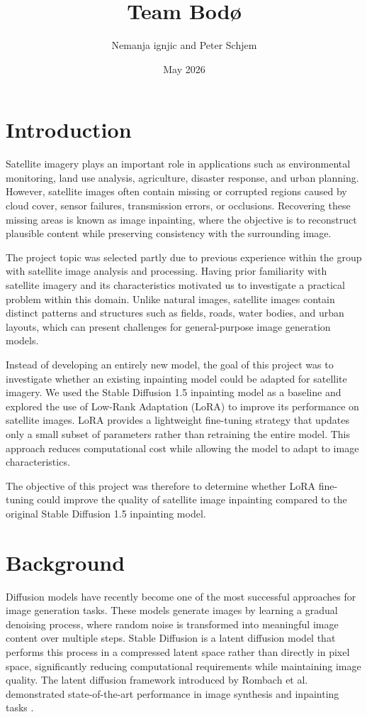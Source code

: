 \documentclass{article}
\title{Team Bodø}
\author{Nemanja ignjic and Peter Schjem}
\date{May 2026}
\begin{document}
\maketitle

\section{Introduction}
Satellite imagery plays an important role in applications such as environmental monitoring, land use analysis, agriculture, disaster response, and urban planning. However, satellite images often contain missing or corrupted regions caused by cloud cover, sensor failures, transmission errors, or occlusions. Recovering these missing areas is known as image inpainting, where the objective is to reconstruct plausible content while preserving consistency with the surrounding image.

The project topic was selected partly due to previous experience within the group with satellite image analysis and processing. Having prior familiarity with satellite imagery and its characteristics motivated us to investigate a practical problem within this domain. Unlike natural images, satellite images contain distinct patterns and structures such as fields, roads, water bodies, and urban layouts, which can present challenges for general-purpose image generation models.

Instead of developing an entirely new model, the goal of this project was to investigate whether an existing inpainting model could be adapted for satellite imagery. We used the Stable Diffusion 1.5 inpainting model as a baseline and explored the use of Low-Rank Adaptation (LoRA) to improve its performance on satellite images. LoRA provides a lightweight fine-tuning strategy that updates only a small subset of parameters rather than retraining the entire model. This approach reduces computational cost while allowing the model to adapt to image characteristics.

The objective of this project was therefore to determine whether LoRA fine-tuning could improve the quality of satellite image inpainting compared to the original Stable Diffusion 1.5 inpainting model.

\newpage

\section{Background}

Diffusion models have recently become one of the most successful approaches for image generation tasks. These models generate images by learning a gradual denoising process, where random noise is transformed into meaningful image content over multiple steps. Stable Diffusion is a latent diffusion model that performs this process in a compressed latent space rather than directly in pixel space, significantly reducing computational requirements while maintaining image quality. The latent diffusion framework introduced by Rombach et al. demonstrated state-of-the-art performance in image synthesis and inpainting tasks \citep{rombach2022latentdiffusion}.
\newline
\end{document}

